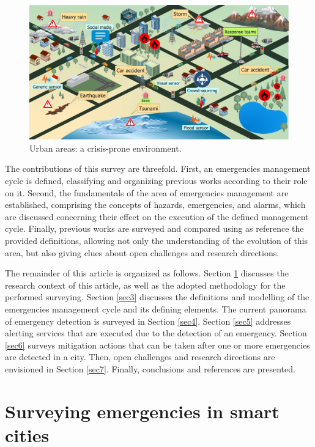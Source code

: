 \begin{refsection}
\begin{figure}[htbp]
\centering
\includegraphics[scale=0.35]{Chapters/1-Survey/images/general.pdf}
\caption{Urban areas: a crisis-prone environment.}\label{Fig:general}
\end{figure}

The contributions of this survey are threefold. First, an emergencies management cycle is defined, classifying and organizing previous works according to their role on it. Second, the fundamentals of the area of emergencies management are established, comprising the concepts of hazards, emergencies, and alarms, which are discussed concerning their effect on the execution of the defined management cycle. Finally, previous works are surveyed and compared using as reference the provided definitions, allowing not only the understanding of the evolution of this area, but also giving clues about open challenges and research directions.

The remainder of this article is organized as follows. Section \ref{sec2} discusses the research context of this article, as well as the adopted methodology for the performed surveying. Section \ref{sec3} discusses the definitions and modelling of the emergencies management cycle and its defining elements. The current panorama of emergency detection is surveyed in Section \ref{sec4}. Section \ref{sec5} addresses alerting services that are executed due to the detection of an emergency. Section \ref{sec6} surveys mitigation actions that can be taken after one or more emergencies are detected in a city. Then, open challenges and research directions are envisioned in Section \ref{sec7}. Finally, conclusions and references are presented.

\section{Surveying emergencies in smart cities}\label{sec2}


\end{refsection}
